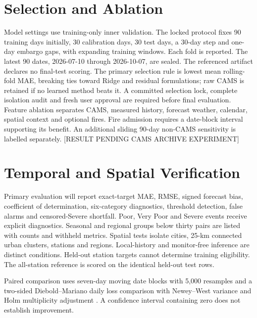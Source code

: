 \documentclass[journal]{IEEEtran}
\begin{document}
\section{Selection and Ablation}
Model settings use training-only inner validation. The locked protocol fixes
90 training days initially, 30 calibration days, 30 test days, a 30-day step and
one-day embargo gaps, with expanding training windows. Each fold is reported.
The latest 90 dates, 2026-07-10 through 2026-10-07, are sealed.
The referenced artifact declares no final-test scoring. The primary selection rule is lowest mean rolling-fold MAE, breaking ties toward Ridge and residual formulations; raw CAMS is retained if no learned method beats it. A committed selection lock, complete isolation audit and fresh user approval are required before final evaluation. Feature ablation separates CAMS, measured history,
forecast weather, calendar, spatial context and optional fires. Fire admission
requires a date-block interval supporting its benefit. An additional sliding
90-day non-CAMS sensitivity is labelled separately.
[RESULT PENDING CAMS ARCHIVE EXPERIMENT]
\clearpage
\section{Temporal and Spatial Verification}
Primary evaluation will report exact-target MAE, RMSE, signed forecast bias,
coefficient of determination, six-category diagnostics, threshold detection,
false alarms and censored-Severe shortfall. Poor, Very Poor and Severe events
receive explicit diagnostics. Seasonal and regional groups below thirty pairs
are listed with counts and withheld metrics.
Spatial tests isolate cities, 25-km connected urban clusters, stations and
regions. Local-history and monitor-free inference are distinct conditions.
Held-out station targets cannot determine training eligibility. The all-station
reference is scored on the identical held-out test rows.

Paired comparison uses seven-day moving date blocks with 5,000 resamples and
a two-sided Diebold--Mariano daily loss comparison with Newey--West variance
and Holm multiplicity adjustment \cite{diebold1995comparing}. A confidence
interval containing zero does not establish improvement.
\end{document}
